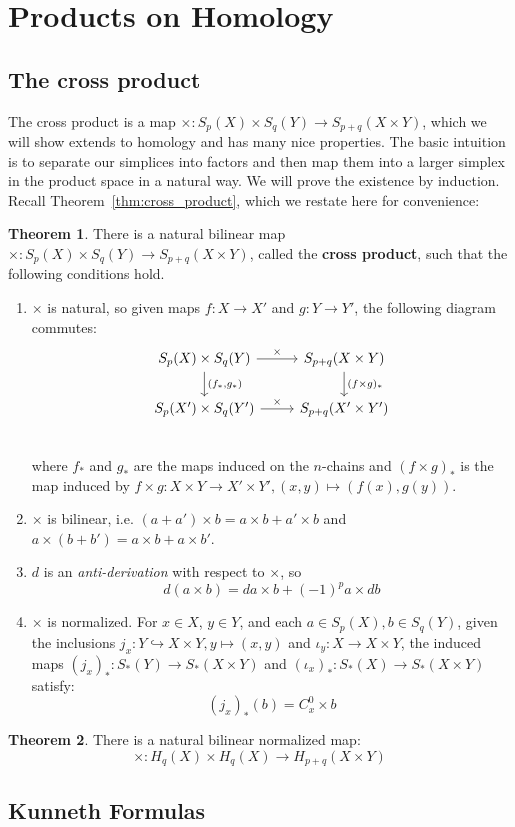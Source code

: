 \documentclass[11pt, oneside]{amsart}   	%
\theoremstyle{definition}
\newtheorem{theorem}{Theorem}[section]
\begin{document}
\newpage
\label{subsec:products}
\section{Products on Homology}

\subsection{The cross product}

The cross product is a map $\times : S_p(X)\times S_q(Y)\rightarrow S_{p + q}(X\times Y)$, which we will show extends to 
homology and has many nice properties. The basic intuition is to separate our simplices into factors and then map them into a 
larger simplex in the product space in a natural way. We will prove the existence by induction. Recall 
Theorem~\ref{thm:cross_product}, which we restate here for convenience:

\begin{theorem}
	There is a natural bilinear map $\times : S_p(X)\times S_q(Y)\rightarrow S_{p + q}(X \times Y)$, called the \textbf{cross 
	product}, such that the following conditions hold.
	\begin{enumerate}
		\item $\times$ is natural, so given maps $f : X\rightarrow X'$ and $g : Y\rightarrow Y'$, the following diagram 
		commutes:
		\[\begin{tikzcd}
			S_p(X)\times S_q(Y) \arrow[r, "\times"]\arrow[d, "{(f_*, g_*)}"] & S_{p + q}(X \times Y)\arrow[d, "(f \times g)_*"] \\
			S_p(X')\times S_q(Y')\arrow[r, "\times"] & S_{p + q}(X'\times Y') \\
		\end{tikzcd}\]
		where $f_*$ and $g_*$ are the maps induced on the $n$-chains and $(f\times g)_*$ is the map induced by 
		$f\times g : X\times Y\rightarrow X'\times Y', (x, y)\mapsto (f(x), g(y))$. 
		\item $\times$ is bilinear, i.e. $(a + a')\times b = a\times b + a'\times b$ and $a\times (b + b') = a\times b + a\times 
		b'$. 
		\item $d$ is an \textit{anti-derivation} with respect to $\times$, so
		\[
			d(a\times b) = da\times b + (-1)^p a\times db
		\]
		\item $\times$ is normalized. For $x\in X$, $y\in Y$, and each $a\in S_p(X), b\in S_q(Y)$, given the inclusions 
		$j_x : Y\hookrightarrow X\times Y, y\mapsto (x, y)$ and $\iota_y : X\rightarrow X\times Y$, the induced maps 
		$(j_x)_* : S_*(Y)\rightarrow S_*(X\times Y)$ and $(\iota_x)_* : S_*(X)\rightarrow S_*(X\times Y)$ satisfy:
		\[
			(j_x)_*(b) = C_x^0\times b
		\]
	\end{enumerate}
\end{theorem}

\begin{theorem}
	There is a natural bilinear normalized map:
	\begin{equation}
		\times : H_q(X)\times H_q(X)\rightarrow H_{p + q}(X\times Y)
	\end{equation}
\end{theorem}

\subsection{Kunneth Formulas}
\end{document}
